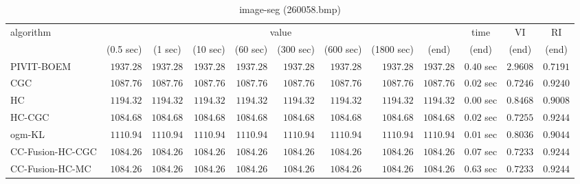 \begin{table}[H]
\scriptsize
\centering
\caption{image-seg (260058.bmp)}
\label{tab:anytimetable-image-seg-260058.bmp}
\begin{tabular}{lrrrrrrrrrrr}
\toprule
           algorithm &                                   \multicolumn{8}{c}{value} & \multicolumn{1}{c}{time}    & \multicolumn{1}{c}{VI}  & \multicolumn{1}{c}{RI} \\  
\cmidrule(lr){2-9}\cmidrule(lr){10-10} \cmidrule(lr){11-11} \cmidrule(lr){12-12}   
                     & \multicolumn{1}{c}{(0.5 sec)} & \multicolumn{1}{c}{(1 sec)} & \multicolumn{1}{c}{(10 sec)} & \multicolumn{1}{c}{(60 sec)} & \multicolumn{1}{c}{(300 sec)} & \multicolumn{1}{c}{(600 sec)} & \multicolumn{1}{c}{(1800 sec)} & \multicolumn{1}{c}{(end)} & \multicolumn{1}{c}{(end)}    & \multicolumn{1}{c}{(end)}   & \multicolumn{1}{c}{(end)}  \\ \midrule 
          PIVIT-BOEM & $      1937.28$ & $      1937.28$ & $      1937.28$ & $      1937.28$ & $      1937.28$ & $      1937.28$ & $      1937.28$ & $      1937.28$ & $         0.40$ sec    & $       2.9608$  & $       0.7191$ \\ 
                 CGC & $      1087.76$ & $      1087.76$ & $      1087.76$ & $      1087.76$ & $      1087.76$ & $      1087.76$ & $      1087.76$ & $      1087.76$ & $         0.02$ sec    & $       0.7246$  & $       0.9240$ \\ 
                  HC & $      1194.32$ & $      1194.32$ & $      1194.32$ & $      1194.32$ & $      1194.32$ & $      1194.32$ & $      1194.32$ & $      1194.32$ & $         0.00$ sec    & $       0.8468$  & $       0.9008$ \\ 
              HC-CGC & $      1084.68$ & $      1084.68$ & $      1084.68$ & $      1084.68$ & $      1084.68$ & $      1084.68$ & $      1084.68$ & $      1084.68$ & $         0.02$ sec    & $       0.7255$  & $       0.9244$ \\ 
              ogm-KL & $      1110.94$ & $      1110.94$ & $      1110.94$ & $      1110.94$ & $      1110.94$ & $      1110.94$ & $      1110.94$ & $      1110.94$ & $         0.01$ sec    & $       0.8036$  & $       0.9044$ \\ 
    CC-Fusion-HC-CGC & $      1084.26$ & $      1084.26$ & $      1084.26$ & $      1084.26$ & $      1084.26$ & $      1084.26$ & $      1084.26$ & $      1084.26$ & $         0.07$ sec    & $       0.7233$  & $       0.9244$ \\ 
     CC-Fusion-HC-MC & $      1084.26$ & $      1084.26$ & $      1084.26$ & $      1084.26$ & $      1084.26$ & $      1084.26$ & $      1084.26$ & $      1084.26$ & $         0.63$ sec    & $       0.7233$  & $       0.9244$ \\ 

\end{tabular}
\end{table}
